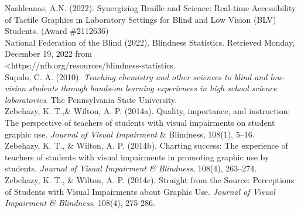\documentclass[11.5pt]{sig-alternate}
\begin{document}
\begin{large}
Nashleanas, A.N. (2022). Synergizing Braille and Science: Real-time Accessibility of Tactile Graphics in Laboratory Settings for Blind and Low Vision (BLV) Students. (Award \#2112636)\\

National Federation of the Blind (2022). Blindness Statistics. Retrieved Monday, December 19, 2022 from \\<https://nfb.org/resources/blindness-statistics.\\

Supalo, C. A. (2010). \textit{Teaching chemistry and other sciences to blind and low-vision students through hands-on learning experiences in high school science laboratories}. The Pennsylvania State University.\\

Zebehazy, K. T.,\& Wilton, A. P. (2014a). Quality, importance, and instruction: The perspective of teachers of students with visual impairments on student graphic use. \textit{Journal of Visual Impairment} \& Blindness, 108(1), 5–16.\\

Zebehazy, K. T., \& Wilton, A. P. (2014b). Charting success: The experience of teachers of students with visual impairments in promoting graphic use by students.\textit{ Journal of Visual Impairment \& Blindness}, 108(4), 263–274.\\

Zebehazy, K. T., \& Wilton, A. P. (2014c). Straight from the Source: Perceptions of Students with Visual Impairments about Graphic Use. \textit{Journal of Visual Impairment \& Blindness}, 108(4), 275-286.\\

\end{large}
\end{document}
